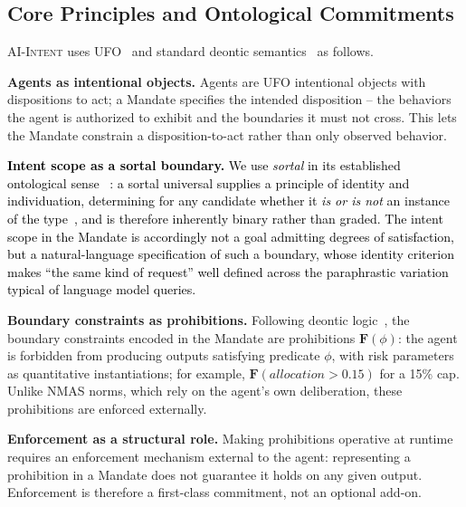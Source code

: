 \documentclass[runningheads]{llncs}
\begin{document}
\subsection{Core Principles and Ontological Commitments}
\label{sec:ontology}

\textsc{AI-Intent} uses UFO~\cite{guizzardi2005ontological} and
standard deontic
semantics~\cite{vonwright1951essay,governatori2007characterising} as follows. %

\textbf{Agents as intentional objects.} Agents are UFO intentional objects with dispositions to act; a Mandate specifies the intended disposition -- the behaviors the agent is authorized to exhibit and the boundaries it must not cross. This lets the Mandate constrain a disposition-to-act rather than only observed behavior.

\textcolor{black}{\textbf{Intent scope as a sortal boundary.} We use \emph{sortal} in its
established ontological sense~\cite{gupta1980common}%
: a sortal universal supplies a principle of identity and individuation, determining for any candidate whether it \emph{is or is not} an instance of the type~\cite{guizzardi2005ontological}, and is therefore inherently binary rather than graded. The intent scope in the Mandate is accordingly not a goal admitting degrees of satisfaction, but a natural-language specification of such a boundary, whose identity criterion makes ``the same kind of request'' well defined across the paraphrastic variation typical of language model queries.}

\textbf{Boundary constraints as prohibitions.} Following deontic logic~\cite{vonwright1951essay}, the boundary constraints encoded in the Mandate are prohibitions $\mathbf{F}(\phi)$: the agent is
forbidden from producing outputs satisfying predicate $\phi$, with risk parameters as quantitative instantiations; for example, $\mathbf{F}(\mathit{allocation} > 0.15)$ for a 15\% cap. Unlike NMAS norms, which rely on the agent's own deliberation, these prohibitions are enforced externally.

\textbf{Enforcement as a structural role.} Making prohibitions operative at runtime requires an enforcement mechanism external to the agent: representing a prohibition in a Mandate does not guarantee it holds on any given output. Enforcement is therefore a first-class commitment, not an optional add-on.
\end{document}
